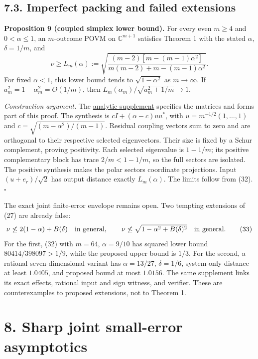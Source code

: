 \documentclass[
  11pt,
  a4paper,
]{article}
\begin{document}
\subsection{7.3. Imperfect packing and failed
extensions}\label{imperfect-packing-and-failed-extensions}

\textbf{Proposition 9 (coupled simplex lower bound).} For every even
\(m\ge4\) and \(0<\alpha\le1\), an \(m\)-outcome POVM on
\(\mathbb C^{m+1}\) satisfies Theorem 1 with the stated \(\alpha\),
\(\delta=1/m\), and \[\nu\ge L_m(\alpha):=
\sqrt{\frac{(m-2)[m-(m-1)\alpha^2]}{m(m-2)+m-(m-1)\alpha^2}}.
\tag{32}\] For fixed \(\alpha<1\), this lower bound tends to
\(\sqrt{1-\alpha^2}\) as \(m\to\infty\). If
\(a_m^2=1-\alpha_m^2=O(1/m)\), then
\(L_m(\alpha_m)/\sqrt{a_m^2+1/m}\to1\).

\emph{Construction argument.} The
\href{https://github.com/christophergardner-star/RC-Discovery/blob/4bb04ff6e2a5f9250a81a0093cfbb1016cbbe82d/theory/imperfect_packing_lower_bound.md}{analytic
supplement} specifies the matrices and forms part of this proof. The
synthesis is \(cI+(\alpha-c)uu^*\), with \(u=m^{-1/2}(1,\ldots,1)\) and
\(c=\sqrt{(m-\alpha^2)/(m-1)}\). Residual coupling vectors sum to zero
and are orthogonal to their respective selected eigenvectors. Their size
is fixed by a Schur complement, proving positivity. Each selected
eigenvalue is \(1-1/m\); its positive complementary block has trace
\(2/m<1-1/m\), so the full sectors are isolated. The positive synthesis
makes the polar sectors coordinate projections. Input \((u+e_r)/\sqrt2\)
has output distance exactly \(L_m(\alpha)\). The limits follow from
(32). \(\square\)

The exact joint finite-error envelope remains open. Two tempting
extensions of (27) are already false:
\[\nu\not\le 2(1-\alpha)+B(\delta)\quad\hbox{in general},\qquad
\nu\not\le\sqrt{1-\alpha^2+B(\delta)^2}\quad\hbox{in general}.
\tag{33}\] For the first, (32) with \(m=64\), \(\alpha=9/10\) has
squared lower bound \(80414/398097>1/9\), while the proposed upper bound
is \(1/3\). For the second, a rational seven-dimensional variant has
\(\alpha=13/27\), \(\delta=1/6\), system-only distance at least
\(1.0405\), and proposed bound at most \(1.0156\). The same supplement
links its exact effects, rational input and sign witness, and verifier.
These are counterexamples to proposed extensions, not to Theorem 1.

\section{8. Sharp joint small-error
asymptotics}\label{sharp-joint-small-error-asymptotics}
\end{document}
